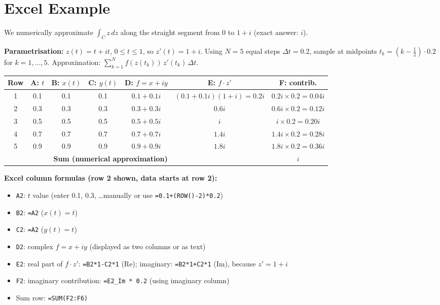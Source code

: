 \documentclass[12pt,a4paper]{article}
\begin{document}
\section{Excel Example}
We numerically approximate $\displaystyle\int_C z\,dz$ along the straight
segment from $0$ to $1+i$ (exact answer: $i$).

\textbf{Parametrisation:} $z(t) = t + it$, $0 \le t \le 1$, so $z'(t) = 1+i$.
Using $N = 5$ equal steps $\Delta t = 0.2$, sample at midpoints
$t_k = (k-\tfrac{1}{2})\cdot 0.2$ for $k = 1,\ldots,5$.
Approximation: $\sum_{k=1}^{N} f(z(t_k))\,z'(t_k)\,\Delta t$.

\medskip
\begin{center}
\begin{tabular}{@{}ccccccc@{}}
\toprule
\textbf{Row} & \textbf{A: $t$} & \textbf{B: $x(t)$} & \textbf{C: $y(t)$}
  & \textbf{D: $f = x+iy$} & \textbf{E: $f \cdot z'$} & \textbf{F: contrib.} \\
\midrule
1 & 0.1 & 0.1 & 0.1 & $0.1+0.1i$ & $(0.1+0.1i)(1+i)=0.2i$ & $0.2i \times 0.2 = 0.04i$ \\
2 & 0.3 & 0.3 & 0.3 & $0.3+0.3i$ & $0.6i$                  & $0.6i \times 0.2 = 0.12i$ \\
3 & 0.5 & 0.5 & 0.5 & $0.5+0.5i$ & $i$                     & $i   \times 0.2 = 0.20i$ \\
4 & 0.7 & 0.7 & 0.7 & $0.7+0.7i$ & $1.4i$                  & $1.4i\times 0.2 = 0.28i$ \\
5 & 0.9 & 0.9 & 0.9 & $0.9+0.9i$ & $1.8i$                  & $1.8i\times 0.2 = 0.36i$ \\
\midrule
\multicolumn{5}{r}{\textbf{Sum (numerical approximation)}} & & $i$ \\
\bottomrule
\end{tabular}
\end{center}

\textbf{Excel column formulas (row 2 shown, data starts at row 2):}
\begin{itemize}[nosep]
  \item \texttt{A2}: $t$ value (enter 0.1, 0.3, \ldots manually or use \texttt{=0.1+(ROW()-2)*0.2})
  \item \texttt{B2}: \texttt{=A2} \quad ($x(t)=t$)
  \item \texttt{C2}: \texttt{=A2} \quad ($y(t)=t$)
  \item \texttt{D2}: complex $f = x+iy$ (displayed as two columns or as text)
  \item \texttt{E2}: real part of $f \cdot z'$: \texttt{=B2*1-C2*1} (Re); imaginary: \texttt{=B2*1+C2*1} (Im), because $z'=1+i$
  \item \texttt{F2}: imaginary contribution: \texttt{=E2\_Im * 0.2} (using imaginary column)
  \item Sum row: \texttt{=SUM(F2:F6)}
\end{itemize}
\end{document}
